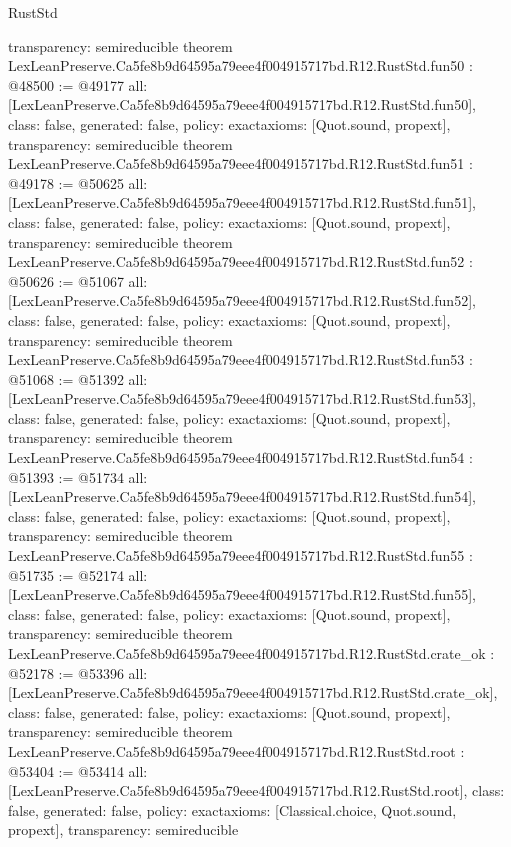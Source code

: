 \begin{lexlean}{RustStd}
\begin{coremodule}
{  transparency: semireducible
}
theorem LexLeanPreserve.Ca5fe8b9d64595a79eee4f004915717bd.R12.RustStd.fun50 : @48500 := @49177 {
  all: [LexLeanPreserve.Ca5fe8b9d64595a79eee4f004915717bd.R12.RustStd.fun50],
  class: false,
  generated: false,
  policy: exact{axioms: [Quot.sound, propext]},
  transparency: semireducible
}
theorem LexLeanPreserve.Ca5fe8b9d64595a79eee4f004915717bd.R12.RustStd.fun51 : @49178 := @50625 {
  all: [LexLeanPreserve.Ca5fe8b9d64595a79eee4f004915717bd.R12.RustStd.fun51],
  class: false,
  generated: false,
  policy: exact{axioms: [Quot.sound, propext]},
  transparency: semireducible
}
theorem LexLeanPreserve.Ca5fe8b9d64595a79eee4f004915717bd.R12.RustStd.fun52 : @50626 := @51067 {
  all: [LexLeanPreserve.Ca5fe8b9d64595a79eee4f004915717bd.R12.RustStd.fun52],
  class: false,
  generated: false,
  policy: exact{axioms: [Quot.sound, propext]},
  transparency: semireducible
}
theorem LexLeanPreserve.Ca5fe8b9d64595a79eee4f004915717bd.R12.RustStd.fun53 : @51068 := @51392 {
  all: [LexLeanPreserve.Ca5fe8b9d64595a79eee4f004915717bd.R12.RustStd.fun53],
  class: false,
  generated: false,
  policy: exact{axioms: [Quot.sound, propext]},
  transparency: semireducible
}
theorem LexLeanPreserve.Ca5fe8b9d64595a79eee4f004915717bd.R12.RustStd.fun54 : @51393 := @51734 {
  all: [LexLeanPreserve.Ca5fe8b9d64595a79eee4f004915717bd.R12.RustStd.fun54],
  class: false,
  generated: false,
  policy: exact{axioms: [Quot.sound, propext]},
  transparency: semireducible
}
theorem LexLeanPreserve.Ca5fe8b9d64595a79eee4f004915717bd.R12.RustStd.fun55 : @51735 := @52174 {
  all: [LexLeanPreserve.Ca5fe8b9d64595a79eee4f004915717bd.R12.RustStd.fun55],
  class: false,
  generated: false,
  policy: exact{axioms: [Quot.sound, propext]},
  transparency: semireducible
}
theorem LexLeanPreserve.Ca5fe8b9d64595a79eee4f004915717bd.R12.RustStd.crate_ok : @52178 := @53396 {
  all: [LexLeanPreserve.Ca5fe8b9d64595a79eee4f004915717bd.R12.RustStd.crate_ok],
  class: false,
  generated: false,
  policy: exact{axioms: [Quot.sound, propext]},
  transparency: semireducible
}
theorem LexLeanPreserve.Ca5fe8b9d64595a79eee4f004915717bd.R12.RustStd.root : @53404 := @53414 {
  all: [LexLeanPreserve.Ca5fe8b9d64595a79eee4f004915717bd.R12.RustStd.root],
  class: false,
  generated: false,
  policy: exact{axioms: [Classical.choice, Quot.sound, propext]},
  transparency: semireducible
}


\end{coremodule}
\end{lexlean}

